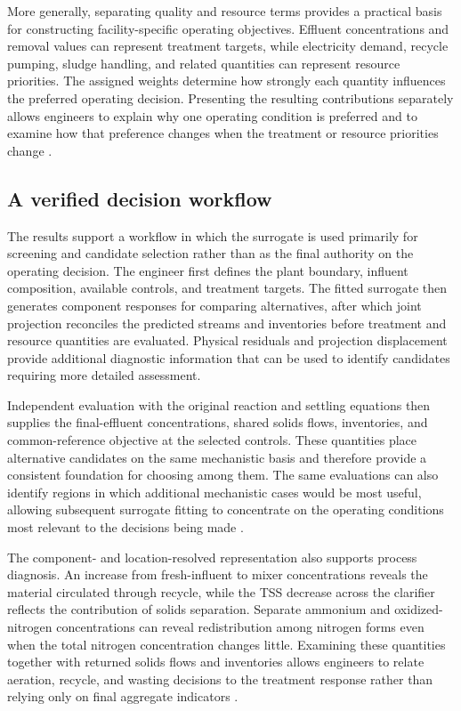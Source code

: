 More generally, separating quality and resource terms provides a practical basis for constructing facility-specific operating objectives. Effluent concentrations and removal values can represent treatment targets, while electricity demand, recycle pumping, sludge handling, and related quantities can represent resource priorities. The assigned weights determine how strongly each quantity influences the preferred operating decision. Presenting the resulting contributions separately allows engineers to explain why one operating condition is preferred and to examine how that preference changes when the treatment or resource priorities change \citep{PadronPaez2020,Miederer2025}.

\subsection{A verified decision workflow}

The results support a workflow in which the surrogate is used primarily for screening and candidate selection rather than as the final authority on the operating decision. The engineer first defines the plant boundary, influent composition, available controls, and treatment targets. The fitted surrogate then generates component responses for comparing alternatives, after which joint projection reconciles the predicted streams and inventories before treatment and resource quantities are evaluated. Physical residuals and projection displacement provide additional diagnostic information that can be used to identify candidates requiring more detailed assessment.

Independent evaluation with the original reaction and settling equations then supplies the final-effluent concentrations, shared solids flows, inventories, and common-reference objective at the selected controls. These quantities place alternative candidates on the same mechanistic basis and therefore provide a consistent foundation for choosing among them. The same evaluations can also identify regions in which additional mechanistic cases would be most useful, allowing subsequent surrogate fitting to concentrate on the operating conditions most relevant to the decisions being made \citep{Alexandrov1998,Hameed2026}.

The component- and location-resolved representation also supports process diagnosis. An increase from fresh-influent to mixer concentrations reveals the material circulated through recycle, while the TSS decrease across the clarifier reflects the contribution of solids separation. Separate ammonium and oxidized-nitrogen concentrations can reveal redistribution among nitrogen forms even when the total nitrogen concentration changes little. Examining these quantities together with returned solids flows and inventories allows engineers to relate aeration, recycle, and wasting decisions to the treatment response rather than relying only on final aggregate indicators \citep{Henze2006,Alex2008,JeppssonDiehl1996}.

